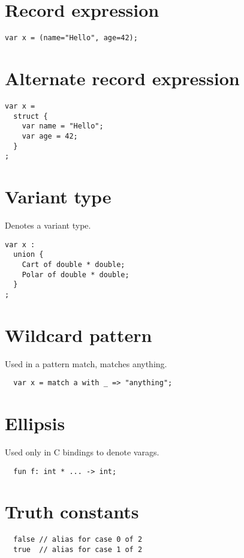 \documentclass[oneside]{book}
\begin{document}
{\section{Record expression}

\begin{verbatim}
var x = (name="Hello", age=42);
\end{verbatim}


\section{Alternate record expression}

\begin{verbatim}
var x = 
  struct {
    var name = "Hello";
    var age = 42;
  }
;
\end{verbatim}


\section{Variant type}
Denotes a variant type.

\begin{verbatim}
var x : 
  union {
    Cart of double * double;
    Polar of double * double;
  }
;
\end{verbatim}


\section{Wildcard pattern}
Used in a pattern match, matches anything.

\begin{verbatim}
  var x = match a with _ => "anything";
\end{verbatim}


\section{Ellipsis}
Used only in C bindings to denote varags.

\begin{verbatim}
  fun f: int * ... -> int;
\end{verbatim}


\section{Truth constants}

\begin{verbatim}
  false // alias for case 0 of 2
  true  // alias for case 1 of 2
\end{verbatim}


}
\end{document}
